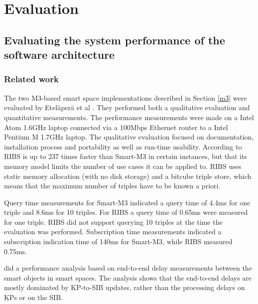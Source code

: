 \chapter{Evaluation}
\label{Evaluation}

\section{Evaluating the system performance of the software architecture}
\label{performance}
\subsection{Related work}
The two M3-based smart space implementations described in Section \ref{m3} were evaluated by Etel\"aper\"a et al \cite{Etelapera2011}. They performed both a qualitative evaluation and quantitative measurements. The performance measurements were made on a Intel Atom 1.6GHz laptop connected via a 100Mbps Ethernet router to a Intel Pentium M 1.7GHz laptop. The qualitative evaluation focused on documentation, installation process and portability as well as run-time usability. According to \cite{Etelapera2011} RIBS is up to 237 times faster than Smart-M3 in certain instances, but that its memory model limits the number of use cases it can be applied to. RIBS uses static memory allocation (with no disk storage) and a bitcube triple store, which means that the maximum number of triples have to be known a priori.

Query time measurements for Smart-M3 indicated a query time of 4.4ms for one triple and 8.6ms for 10 triples. For RIBS a query time of 0.65ms were measured for one triple. RIBS did not support querying 10 triples at the time the evaluation was performed. Subscription time measurements indicated a subscription indication time of 140ms for Smart-M3, while RIBS measured 0.75ms.

\cite{Bhardwaj2011} did a performance analysis based on end-to-end delay measurements between the smart objects in smart spaces. The analysis shows that the end-to-end delays are mostly dominated by KP-to-SIB updates, rather than the processing delays on KPs or on the SIB.


